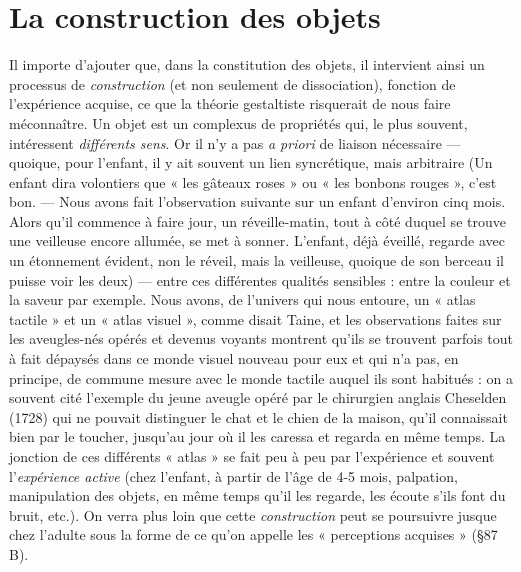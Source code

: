 \section{La construction des objets}%
Il importe d'ajouter que,
dans la constitution des objets, il intervient ainsi un processus de
{\it construction} (et non seulement de dissociation), fonction de l’expérience
acquise, ce que la théorie gestaltiste risquerait de nous faire
méconnaître. Un objet est un complexus de propriétés qui, le plus
souvent, intéressent {\it différents sens}. Or il n’y a pas {\it a priori} de liaison
nécessaire — quoique, pour l’enfant, il y ait souvent un lien syncrétique,
mais arbitraire
{\scriptsize (Un enfant dira volontiers que « les gâteaux roses » ou « les bonbons rouges », c'est
bon. — Nous avons fait l'observation suivante sur un enfant d'environ cinq mois.
Alors qu’il commence à faire jour, un réveille-matin, tout à côté duquel se trouve une
veilleuse encore allumée, se met à sonner. L'enfant, déjà éveillé, regarde avec un étonnement
évident, non le réveil, mais la veilleuse, quoique de son berceau il puisse voir
les deux)}
 — entre ces différentes qualités sensibles :
entre la couleur et la saveur par exemple. Nous avons, de l’univers
qui nous entoure, un « atlas tactile » et un « atlas visuel », comme
disait Taine, et les observations faites sur les aveugles-nés opérés et
devenus voyants montrent qu’ils se trouvent parfois tout à fait
dépaysés dans ce monde visuel nouveau pour eux et qui n’a pas, en
principe, de commune mesure avec le monde tactile auquel ils sont
habitués : on a souvent cité l’exemple du jeune aveugle opéré par le
chirurgien anglais Cheselden (1728) qui ne pouvait distinguer le chat
et le chien de la maison, qu’il connaissait bien par le toucher, jusqu’au
jour où il les caressa et regarda en même temps. La jonction de ces
différents « atlas » se fait peu à peu par l’expérience et souvent l'{\it expérience
active} (chez l’enfant, à partir de l’âge de 4-5 mois, palpation,
manipulation des objets, en même temps qu'il les regarde, les écoute
s’ils font du bruit, etc.). On verra plus loin que cette {\it construction} peut
se poursuivre jusque chez l’adulte sous la forme de ce qu’on appelle
les « perceptions acquises » (\S 87 B).


